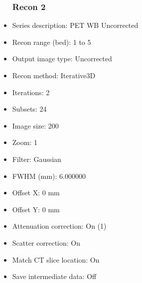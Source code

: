 \documentclass[12pt]{article}
\begin{document}
\begin{itemize}
\subsubsection{Recon 2}
\item Series description: PET WB Uncorrected
\item Recon range (bed): 1 to 5
\item Output image type: Uncorrected
\item Recon method: Iterative3D
\item Iterations: 2
\item Subsets: 24
\item Image size: 200
\item Zoom: 1
\item Filter: Gaussian
\item FWHM (mm): 6.000000
\item Offset X: 0 mm
\item Offset Y: 0 mm
\item Attenuation correction: On (1)
\item Scatter correction: On
\item Match CT slice location: On
\item Save intermediate data: Off
\end{itemize}
\end{document}
